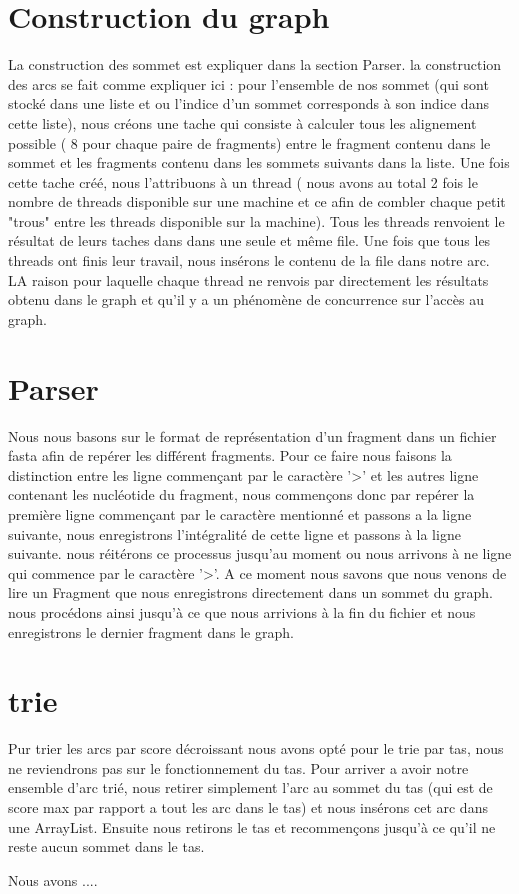 \documentclass[a4paper]{article}
\begin{document}
\section{Construction du graph}
La construction des sommet est expliquer dans la section Parser. 
la construction des arcs se fait comme expliquer ici : pour l'ensemble de nos sommet (qui sont stocké dans une liste et ou l'indice d'un sommet corresponds à son indice dans cette liste), nous créons une tache qui consiste à calculer tous les alignement possible ( 8 pour chaque paire de fragments) entre le fragment contenu dans le sommet et les fragments contenu dans les sommets suivants dans la liste. Une fois cette tache créé, nous l'attribuons à un thread ( nous avons au total 2 fois le nombre de threads disponible sur une machine et ce afin de combler chaque petit "trous" entre les threads disponible sur la machine). Tous les threads renvoient le résultat de leurs taches dans dans une seule et même file. Une fois que tous les threads ont finis leur travail, nous insérons le contenu de la file dans notre arc. LA raison pour laquelle chaque thread ne renvois par directement les résultats obtenu dans le graph et qu'il y a un phénomène de concurrence sur l'accès au graph.  


\section{Parser}
Nous nous basons sur le format de représentation d'un fragment dans un fichier fasta afin de repérer les différent fragments. Pour ce faire nous faisons la distinction entre les ligne commençant par le caractère '>' et les autres ligne contenant les nucléotide du fragment, nous commençons donc par repérer la première ligne commençant par le caractère mentionné et passons a la ligne suivante, nous enregistrons l'intégralité de cette ligne et passons à la ligne suivante. nous réitérons ce processus jusqu'au moment ou nous arrivons à ne ligne qui commence par le caractère '>'. A ce moment nous savons que nous venons de lire un Fragment que nous enregistrons directement dans un sommet du graph. nous procédons ainsi jusqu'à ce que nous arrivions à la fin du fichier et nous enregistrons le dernier fragment dans le graph. 


\section{trie}
Pur trier les arcs par score décroissant nous avons opté pour le trie par tas, nous ne reviendrons pas sur le fonctionnement du tas. Pour arriver a avoir notre ensemble d'arc trié, nous retirer simplement l'arc au sommet du tas (qui est de score max par rapport a tout les arc dans le tas) et nous insérons cet arc dans une ArrayList. Ensuite nous retirons le tas et recommençons jusqu'à ce qu'il ne reste aucun sommet dans le tas. 

\hspace{0.5cm}Nous avons ....
\end{document}
